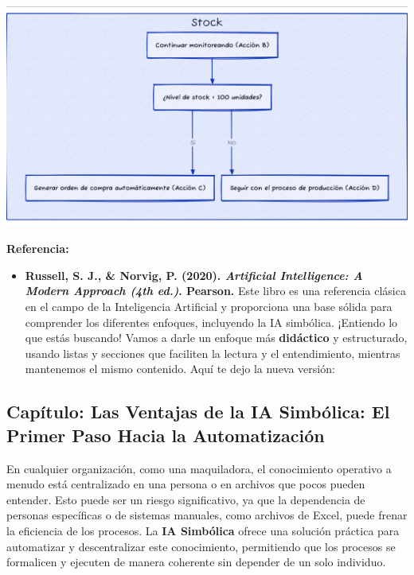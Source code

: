 \documentclass[
  10pt,
  letterpaper,
]{book}
\providecommand{\tightlist}{%
  \setlength{\itemsep}{0pt}\setlength{\parskip}{0pt}}\usepackage{longtable,booktabs,array}
\begin{document}
\includegraphics[width=1\textwidth,height=\textheight]{index_files/mediabag/diagram-2.pdf}

\textbf{Referencia:}

\begin{itemize}
\tightlist
\item
  \textbf{Russell, S. J., \& Norvig, P. (2020). \emph{Artificial
  Intelligence: A Modern Approach (4th ed.)}. Pearson.} Este libro es
  una referencia clásica en el campo de la Inteligencia Artificial y
  proporciona una base sólida para comprender los diferentes enfoques,
  incluyendo la IA simbólica. ¡Entiendo lo que estás buscando! Vamos a
  darle un enfoque más \textbf{didáctico} y estructurado, usando listas
  y secciones que faciliten la lectura y el entendimiento, mientras
  mantenemos el mismo contenido. Aquí te dejo la nueva versión:
\end{itemize}

\subsection{Capítulo: Las Ventajas de la IA Simbólica: El Primer Paso
Hacia la
Automatización}\label{capuxedtulo-las-ventajas-de-la-ia-simbuxf3lica-el-primer-paso-hacia-la-automatizaciuxf3n}

En cualquier organización, como una maquiladora, el conocimiento
operativo a menudo está centralizado en una persona o en archivos que
pocos pueden entender. Esto puede ser un riesgo significativo, ya que la
dependencia de personas específicas o de sistemas manuales, como
archivos de Excel, puede frenar la eficiencia de los procesos. La
\textbf{IA Simbólica} ofrece una solución práctica para automatizar y
descentralizar este conocimiento, permitiendo que los procesos se
formalicen y ejecuten de manera coherente sin depender de un solo
individuo.
\end{document}
